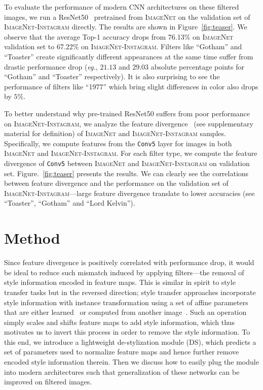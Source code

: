 \documentclass[letterpaper]{article} %
\newcommand{\instagram}{{\scshape ImageNet-Instagram}\xspace}
\newcommand{\imagenet}{{\scshape ImageNet}\xspace}
\begin{document}
To evaluate the performance of modern CNN architectures on these filtered images, we run a ResNet50~\cite{he2016deep} pretrained from \imagenet on the validation set of \instagram directly. The results are shown in Figure~\ref{fig:teaser}.  We observe that the average Top-1 accuracy drops from 76.13\% on  \imagenet validation set to 67.22\% on \instagram. Filters like ``Gotham'' and ``Toaster''  create significantly different appearances at the same time suffer from
drastic performance drop (\textit{eg.}, $21.13$ and $29.03$ absolute percentage points for ``Gotham'' and ``Toaster'' respectively). It is also surprising to see the performance of filters like ``1977'' which bring slight differences in color also drops by $5\%$.

To better understand why pre-trained ResNet50 suffers from poor performance on \instagram, we analyze the feature divergence~\cite{pan2018two} (see supplementary material for definition) of \imagenet and \instagram samples.
Specifically, we compute features from the \texttt{Conv5} layer for images in both \imagenet and \instagram. For each filter type, we compute the feature divergence of \texttt{Conv5} between \imagenet and \instagram on validation set. Figure.~\ref{fig:teaser} presents the results.
We can clearly see the correlations between feature divergence and the performance on the validation set of \instagram---large feature divergence translate to lower accuracies (see ``Toaster'', ``Gotham'' and ``Lord Kelvin'').


\section{Method}
Since feature divergence is positively correlated with performance drop, it would be ideal to reduce such mismatch induced by applying filters---the removal of style information encoded in feature maps. This is similar in spirit to style transfer tasks but in the reversed direction; style transfer approaches incorporate style information with instance transformation using a set of affine parameters that are either learned~\cite{ulyanov2016instance} or computed from another image~\cite{huang2017adain}. Such an operation simply scales and shifts feature maps to add style information, which thus motivates us to invert this process in order to remove the style information. To this end, we introduce a lightweight de-stylization module (DS), which predicts a set of parameters used to normalize feature maps and hence further remove encoded style information therein. Then we discuss how to easily plug the module into modern architectures such that generalization of these networks can be improved on filtered images.
\end{document}
